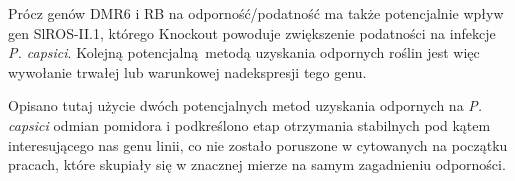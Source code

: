 \documentclass[two column, twoside, a4paper]{article}
\begin{document}
Prócz genów DMR6 i RB na odporność/podatność ma także potencjalnie wpływ gen SlROS-II.1, którego Knockout powoduje zwiększenie podatności na infekcje \textit{P. capsici}\autocite{Yang2020}. Kolejną potencjalną metodą uzyskania odpornych roślin jest więc wywołanie trwałej lub warunkowej nadekspresji tego genu.

Opisano tutaj użycie dwóch potencjalnych metod uzyskania odpornych na \textit{P. capsici} odmian pomidora i podkreślono etap otrzymania stabilnych pod kątem interesującego nas genu linii, co nie zostało poruszone w cytowanych na początku pracach, które skupiały się w znacznej mierze na samym zagadnieniu odporności.

\printbibliography
\end{document}

